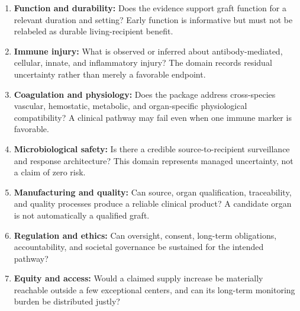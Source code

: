 \documentclass[conference]{IEEEtran}
\begin{document}
\begin{enumerate}
\item \textbf{Function and durability:} Does the evidence support graft function for a relevant duration and setting? Early function is informative but must not be relabeled as durable living-recipient benefit.
\item \textbf{Immune injury:} What is observed or inferred about antibody-mediated, cellular, innate, and inflammatory injury? The domain records residual uncertainty rather than merely a favorable endpoint.
\item \textbf{Coagulation and physiology:} Does the package address cross-species vascular, hemostatic, metabolic, and organ-specific physiological compatibility? A clinical pathway may fail even when one immune marker is favorable.
\item \textbf{Microbiological safety:} Is there a credible source-to-recipient surveillance and response architecture? This domain represents managed uncertainty, not a claim of zero risk.
\item \textbf{Manufacturing and quality:} Can source, organ qualification, traceability, and quality processes produce a reliable clinical product? A candidate organ is not automatically a qualified graft.
\item \textbf{Regulation and ethics:} Can oversight, consent, long-term obligations, accountability, and societal governance be sustained for the intended pathway?
\item \textbf{Equity and access:} Would a claimed supply increase be materially reachable outside a few exceptional centers, and can its long-term monitoring burden be distributed justly?
\end{enumerate}
\end{document}
